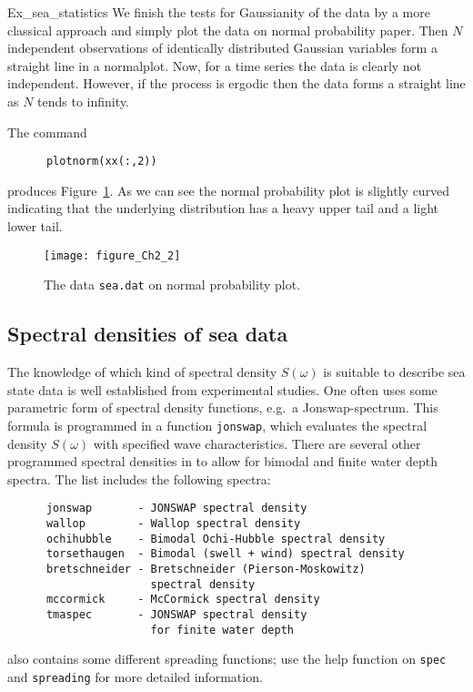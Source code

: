 \begin{cex}{Ex_sea_statistics}
We finish the tests for Gaussianity of the data by a more classical
approach and simply plot the data on normal probability paper.
Then $N$ independent observations of identically distributed Gaussian
variables form a straight line in a normalplot.
Now, for a time series the data is clearly not
independent. However, if the process is ergodic then
the data forms a straight line as $N$ tends to infinity.

The command 
{\small\begin{verbatim}
      plotnorm(xx(:,2))
\end{verbatim}}
\noindent produces Figure~\ref{fig2-4}.
As we can see the normal probability plot is slightly curved
indicating that the underlying distribution has a heavy
upper tail and a light lower tail.
\end{cex}
\begin{figure}[t]
\centering
\texttt{[image: figure\_Ch2\_2]}
\vspace{-3mm}
  \caption[Normal probability plot]{The data {\tt sea.dat} on
   normal probability plot.}
  \label{fig2-4}
\end{figure}

\subsection{Spectral densities of sea data}

The knowledge of which kind of spectral density $S(\omega)$ is suitable
to describe sea state data is well established from experimental
studies. One often uses some parametric form of spectral density
functions, e.g.\ a {\sc Jonswap}-spectrum. 
This formula is programmed in a \progname{}
function 
{\tt jonswap}, which evaluates the spectral density $S(\omega)$
with specified wave characteristics. There are several other
programmed spectral densities in \progname{} to allow for bimodal and
finite water depth spectra. The list includes the following spectra:
{\small\begin{verbatim}
      jonswap       - JONSWAP spectral density
      wallop        - Wallop spectral density
      ochihubble    - Bimodal Ochi-Hubble spectral density
      torsethaugen  - Bimodal (swell + wind) spectral density
      bretschneider - Bretschneider (Pierson-Moskowitz)
                      spectral density
      mccormick     - McCormick spectral density
      tmaspec       - JONSWAP spectral density
                      for finite water depth
\end{verbatim}}
\progname{} also contains some different spreading functions;
use the help function on {\tt spec} and {\tt spreading}
for more detailed information.

